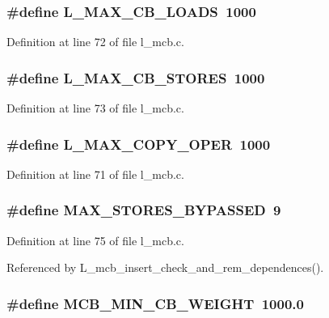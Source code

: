 \subsubsection{\setlength{\rightskip}{0pt plus 5cm}\#define L\_\-MAX\_\-CB\_\-LOADS~1000}\label{l__mcb_8c_43574b2d835a9e874738e64e23e4a348}




Definition at line 72 of file l\_\-mcb.c.
\subsubsection{\setlength{\rightskip}{0pt plus 5cm}\#define L\_\-MAX\_\-CB\_\-STORES~1000}\label{l__mcb_8c_d3eeddc721ff56909542221baf589402}




Definition at line 73 of file l\_\-mcb.c.
\subsubsection{\setlength{\rightskip}{0pt plus 5cm}\#define L\_\-MAX\_\-COPY\_\-OPER~1000}\label{l__mcb_8c_f0a77018e61cc8d0607e3b5fef379a5a}




Definition at line 71 of file l\_\-mcb.c.
\subsubsection{\setlength{\rightskip}{0pt plus 5cm}\#define MAX\_\-STORES\_\-BYPASSED~9}\label{l__mcb_8c_5262663f922a4f37193962ebd54db357}




Definition at line 75 of file l\_\-mcb.c.

Referenced by L\_\-mcb\_\-insert\_\-check\_\-and\_\-rem\_\-dependences().
\subsubsection{\setlength{\rightskip}{0pt plus 5cm}\#define MCB\_\-MIN\_\-CB\_\-WEIGHT~1000.0}\label{l__mcb_8c_d51acee83fd019040304d18c7ffd63fa}




